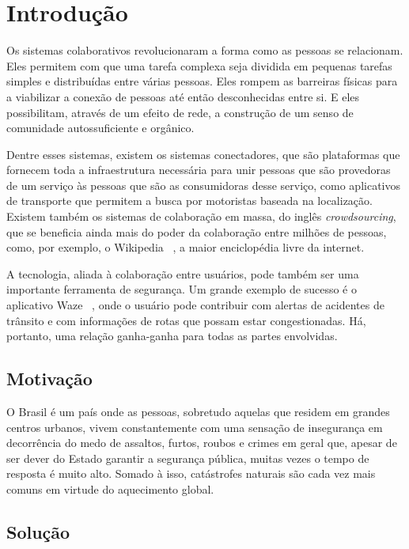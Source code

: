 \chapter{Introdução}

Os sistemas colaborativos revolucionaram a forma como as pessoas se relacionam. Eles permitem com que uma tarefa complexa seja dividida em pequenas tarefas simples e distribuídas entre várias pessoas. Eles rompem as barreiras físicas para a viabilizar a conexão de pessoas até então desconhecidas entre si. E eles possibilitam, através de um efeito de rede, a construção de um senso de comunidade autossuficiente e orgânico.

Dentre esses sistemas, existem os sistemas conectadores, que são plataformas que fornecem toda a infraestrutura necessária para unir pessoas que são provedoras de um serviço às pessoas que são as consumidoras desse serviço, como aplicativos de transporte que permitem a busca por motoristas baseada na localização. Existem também os sistemas de colaboração em massa, do inglês \emph{crowdsourcing}, que se beneficia ainda mais do poder da colaboração entre milhões de pessoas, como, por exemplo, o Wikipedia ~\cite{wikipedia}, a maior enciclopédia livre da internet.

A tecnologia, aliada à colaboração entre usuários, pode também ser uma importante ferramenta de segurança. Um grande exemplo de sucesso é o aplicativo Waze ~\cite{waze}, onde o usuário pode contribuir com alertas de acidentes de trânsito e com informações de rotas que possam estar congestionadas. Há, portanto, uma relação ganha-ganha para todas as partes envolvidas.

\section{Motivação}

O Brasil é um país onde as pessoas, sobretudo aquelas que residem em grandes centros urbanos, vivem constantemente com uma sensação de insegurança em decorrência do medo de assaltos, furtos, roubos e crimes em geral que, apesar de ser dever do Estado garantir a segurança pública, muitas vezes o tempo de resposta é muito alto. Somado à isso, catástrofes naturais são cada vez mais comuns em virtude do aquecimento global.

\section{Solução}

